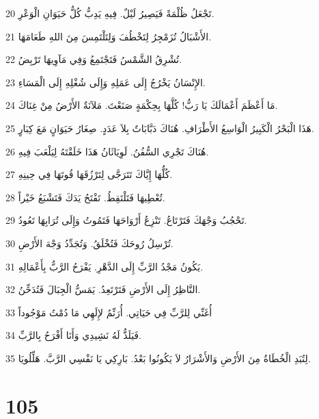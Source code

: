 \par 20 تَجْعَلُ ظُلْمَةً فَيَصِيرُ لَيْلٌ. فِيهِ يَدِبُّ كُلُّ حَيَوَانِ الْوَعْرِ.
\par 21 الأَشْبَالُ تُزَمْجِرُ لِتَخْطُفَ وَلِتَلْتَمِسَ مِنَ اللهِ طَعَامَهَا.
\par 22 تُشْرِقُ الشَّمْسُ فَتَجْتَمِعُ وَفِي مَآوِيهَا تَرْبِضُ.
\par 23 الإِنْسَانُ يَخْرُجُ إِلَى عَمَلِهِ وَإِلَى شُغْلِهِ إِلَى الْمَسَاءِ.
\par 24 مَا أَعْظَمَ أَعْمَالَكَ يَا رَبُّ! كُلَّهَا بِحِكْمَةٍ صَنَعْتَ. مَلآنَةٌ الأَرْضُ مِنْ غِنَاكَ.
\par 25 هَذَا الْبَحْرُ الْكَبِيرُ الْوَاسِعُ الأَطْرَافِ. هُنَاكَ دَبَّابَاتٌ بِلاَ عَدَدٍ. صِغَارُ حَيَوَانٍ مَعَ كِبَارٍ.
\par 26 هُنَاكَ تَجْرِي السُّفُنُ. لَوِيَاثَانُ هَذَا خَلَقْتَهُ لِيَلْعَبَ فِيهِ.
\par 27 كُلُّهَا إِيَّاكَ تَتَرَجَّى لِتَرْزُقَهَا قُوتَهَا فِي حِينِهِ.
\par 28 تُعْطِيهَا فَتَلْتَقِطُ. تَفْتَحُ يَدَكَ فَتَشْبَعُ خَيْراً.
\par 29 تَحْجُبُ وَجْهَكَ فَتَرْتَاعُ. تَنْزِعُ أَرْوَاحَهَا فَتَمُوتُ وَإِلَى تُرَابِهَا تَعُودُ.
\par 30 تُرْسِلُ رُوحَكَ فَتُخْلَقُ. وَتُجَدِّدُ وَجْهَ الأَرْضِ.
\par 31 يَكُونُ مَجْدُ الرَّبِّ إِلَى الدَّهْرِ. يَفْرَحُ الرَّبُّ بِأَعْمَالِهِ.
\par 32 النَّاظِرُ إِلَى الأَرْضِ فَتَرْتَعِدُ. يَمَسُّ الْجِبَالَ فَتُدَخِّنُ.
\par 33 أُغَنِّي لِلرَّبِّ فِي حَيَاتِي. أُرَنِّمُ لإِلَهِي مَا دُمْتُ مَوْجُوداً
\par 34 فَيَلَذُّ لَهُ نَشِيدِي وَأَنَا أَفْرَحُ بِالرَّبِّ.
\par 35 لِتُبَدِ الْخُطَاةُ مِنَ الأَرْضِ وَالأَشْرَارُ لاَ يَكُونُوا بَعْدُ. بَارِكِي يَا نَفْسِي الرَّبَّ. هَلِّلُويَا.

\chapter{105}


